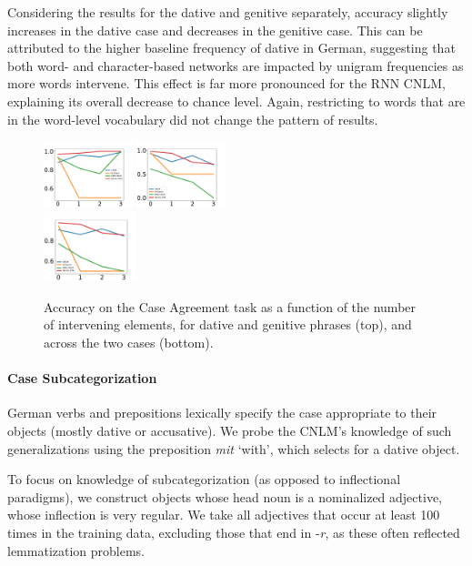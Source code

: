 Considering the results for the dative and genitive separately, accuracy slightly increases in the dative case and decreases in the genitive case.
This can be attributed to the higher baseline frequency of dative in German, suggesting that both word- and character-based networks are impacted by unigram frequencies as more words intervene.
This effect is far more pronounced for the RNN CNLM, explaining its overall decrease to chance level.
Again, restricting to words that are in the word-level vocabulary did not change the pattern of results.
\begin{figure}
\includegraphics[width=0.23\textwidth]{figures/german-case-Dative.pdf}
\includegraphics[width=0.23\textwidth]{figures/german-case-Genitive.pdf} \\

\includegraphics[width=0.24\textwidth]{figures/german-case-total.pdf}
	\caption{Accuracy on the Case Agreement task as a function of the number of intervening elements, for dative and genitive phrases (top), and across the two cases (bottom).}\label{fig:case}
\end{figure}

\paragraph{Case Subcategorization}
German verbs and prepositions lexically specify the case appropriate to their objects (mostly dative or accusative).
We probe the CNLM's knowledge of such generalizations using the preposition \textit{mit} `with', which selects for a dative object.

To focus on knowledge of subcategorization (as opposed to inflectional paradigms), we construct objects whose head noun is a nominalized adjective, whose inflection is very regular.
We take all adjectives that occur at least 100 times in the training data, excluding those that end in -\emph{r}, as these often reflected lemmatization problems.

